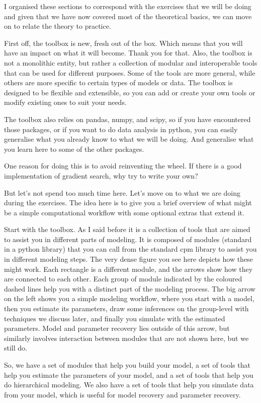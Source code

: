 \documentclass[12pt]{article}
\begin{document}
I organised these sections to correspond with the exercises that we will be doing and given that we have now covered most of the theoretical basics, we can move on to relate the theory to practice.

First off, the toolbox is new, fresh out of the box. Which means that you will have an impact on what it will become. Thank you for that. Also, the toolbox is not a monolithic entity, but rather a collection of modular and interoperable tools that can be used for different purposes. Some of the tools are more general, while others are more specific to certain types of models or data. The toolbox is designed to be flexible and extensible, so you can add or create your own tools or modify existing ones to suit your needs.

The toolbox also relies on pandas, numpy, and scipy, so if you have encountered those packages, or if you want to do data analysis in python, you can easily generalise what you already know to what we will be doing. And generalise what you learn here to some of the other packages.

One reason for doing this is to avoid reinventing the wheel. If there is a good implementation of gradient search, why try to  write your own? 

But let's not spend too much time here. Let's move on to what we are doing during the exercises. The idea here is to give you a brief overview of what might be a simple computational workflow with some optional extras that extend it.

Start with the toolbox. As I said before it is a collection of tools that are aimed to assist you in different parts of modeling.  It is composed of modules (standard in a python library) that you can call from the standard cpm library to assist you in different modeling steps. The very dense figure you see here depicts how these might work. Each rectangle is a different module, and the arrows show how they are connected to each other. Each group of module indicated by the coloured dashed lines help you with a distinct part of the modeling process. The big arrow on the left shows you a simple modeling workflow, where you start with a model, then you estimate its parameters, draw some inferences on the group-level with techniques we discuss later, and finally you simulate with the estimated parameters. Model and parameter recovery lies outside of this arrow, but similarly involves interaction between modules that are not shown here, but we still do.

So, we have a set of modules that help you build your model, a set of tools that help  you estimate the parameters of your model, and a set of tools that help you do hierarchical modeling. We also have a set of tools that help you simulate data from your model, which is useful for model recovery and parameter recovery.
\end{document}
